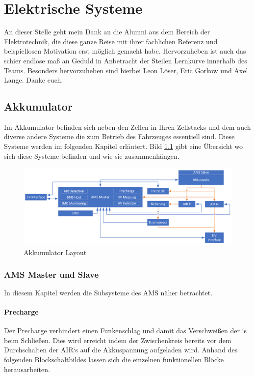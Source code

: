 
\chapter{Elektrische Systeme}
An dieser Stelle geht mein Dank an die Alumni aus dem Bereich der Elektrotechnik, die diese ganze Reise mit ihrer fachlichen Referenz und beispiellosen Motivation erst möglich gemacht habe. Hervorzuheben ist auch das schier endlose maß an Geduld in Anbetracht der Steilen Lernkurve innerhalb des Teams. Besonders hervorzuheben sind hierbei Leon Löser, Eric Gorkow und Axel Lange. Danke euch.
\FloatBarrier
\section{Akkumulator}
Im Akkumulator befinden sich neben den Zellen in Ihren Zellstacks und dem  auch diverse andere Systeme die zum Betrieb des Fahrzeuges essentiell sind. Diese Systeme werden im folgenden Kapitel erläutert. Bild \ref{fig:accumulator-layout} gibt eine Übersicht wo sich diese Systeme befinden und wie sie zusammenhängen.

\begin{figure}
	\centering
	\includegraphics[width=0.9\linewidth]{"bilder/Accumulator Layout"}
	\caption{Akkumulator Layout}
	\label{fig:accumulator-layout}
\end{figure}

\FloatBarrier

\subsection{\ac{AMS} Master und Slave}
In diesem Kapitel werden die Subsysteme des \ac{AMS} näher betrachtet.
\FloatBarrier

\subsubsection{Precharge}
Der Precharge verhindert einen Funkenschlag und damit das Verschweißen der `s beim Schließen. Dies wird erreicht indem der Zwischenkreis bereits vor dem Durchschalten der \ac{AIR}`s auf die Akkuspannung aufgeladen wird. Anhand des folgenden Blockschaltbildes lassen sich die einzelnen funktionellen Blöcke herausarbeiten.

